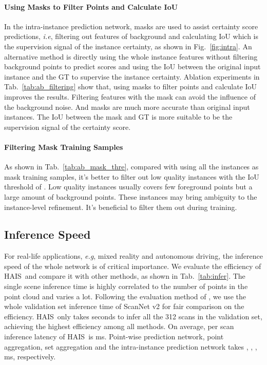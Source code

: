 \documentclass[10pt,twocolumn,letterpaper]{article}
\newcommand{\thename}{HAIS}
\def\eg{\emph{e.g}\onedot} \def\Eg{\emph{E.g}\onedot}
\def\ie{\emph{i.e}\onedot} \def\Ie{\emph{I.e}\onedot}
\begin{document}
\paragraph{Using Masks to Filter Points and Calculate IoU}
In the intra-instance prediction network, masks are used to assist certainty score predictions, \ie{}, filtering out features of background and calculating IoU which is the supervision signal of the instance certainty, as shown in Fig.~\ref{fig:intra}.
An alternative method is directly using the whole instance features without filtering background points to predict scores and using the IoU between the original input instance and the GT to supervise the instance certainty.
Ablation experiments in Tab.~\ref{tab:ab_filtering} show that, using masks to filter points and calculate IoU improves the results.
Filtering features with the mask can avoid the influence of the background noise.
And masks are much more accurate than original input instances. The IoU between the mask and GT is more suitable to be the supervision signal of the certainty score.

\paragraph{Filtering Mask Training Samples}
As shown in Tab.~\ref{tab:ab_mask_thre}, compared with using all the instances as mask training samples, it's better to filter out low quality instances with the IoU threshold of .
Low quality instances usually covers few foreground points but a large amount of background points. These instances may bring ambiguity to the instance-level refinement. It's beneficial to filter them out during training.

\subsection{Inference Speed}
\label{sec:inference_speed}
For real-life applications, \eg, mixed reality and autonomous driving, the inference speed of the whole network is of critical importance. 
We evaluate the efficiency of \thename\ and compare it with other methods, as shown in Tab.~\ref{tab:infer}. 
The single scene inference time is highly correlated to the number of points in the point cloud and varies a lot. Following the evaluation method of \cite{BoNet,OccuSeg,GICN}, 
we use the whole validation set inference time of ScanNet v2 for fair comparison on the efficiency. 
\thename\ only takes  seconds to infer all the 312 scans in the validation set, achieving the highest efficiency among all methods. 
On average, per scan inference latency of \thename\ is  ms.
Point-wise prediction network, point aggregation, set aggregation and the intra-instance prediction network takes , , ,  ms, respectively.
\end{document}
